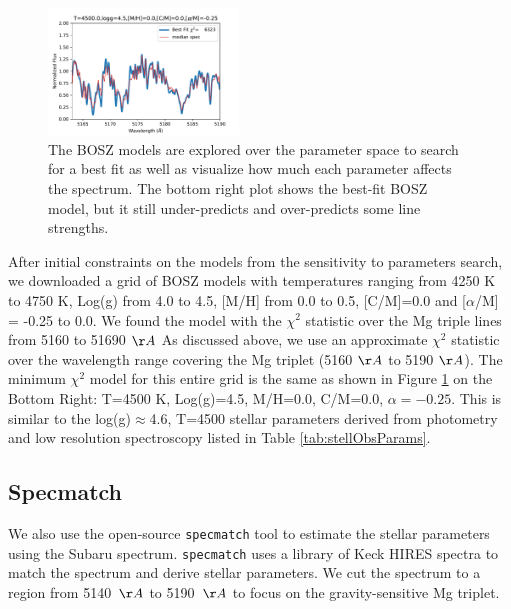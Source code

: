 \documentclass[preprint]{aastex61}
\begin{document}
\begin{figure}[!hbtp]
\begin{centering}
\includegraphics[width=0.45\textwidth]{images/bosz_model_exploration/FINAL_exploration.pdf}
\caption{The BOSZ models are explored over the parameter space to search for a best fit as well as visualize how much each parameter affects the spectrum.
The bottom right plot shows the best-fit BOSZ model, but it still under-predicts and over-predicts some line strengths.}\label{fig:boszModelParamsMedianSpec}
\end{centering}
\end{figure}

After initial constraints on the models from the sensitivity to parameters search, we downloaded a grid of BOSZ models with temperatures ranging from 4250 K to 4750 K, Log(g) from 4.0 to 4.5, [M/H] from 0.0 to 0.5, [C/M]=0.0 and [$\alpha$/M] = -0.25 to 0.0.
We found the model with the  $\chi^2$ statistic over the Mg triple lines from 5160 to 51690 $\AA$
As discussed above, we use an approximate $\chi^2$ statistic over the wavelength range covering the Mg triplet (5160 $\AA$ to 5190 $\AA$).
The minimum $\chi^2$ model for this entire grid is the same as shown in Figure \ref{fig:boszModelParamsMedianSpec} on the Bottom Right: T=4500 K, Log(g)=4.5, M/H=0.0, C/M=0.0, $\alpha=-0.25$.
This is similar to the log(g)$\approx$4.6, T=4500 stellar parameters derived from photometry and low resolution spectroscopy listed in Table \ref{tab:stellObsParams}.

\subsection{Specmatch}\label{sec:SpecMatch}

We also use the open-source \texttt{specmatch} tool \citep{yee2017specMatch} to estimate the stellar parameters using the Subaru spectrum.
\texttt{specmatch} uses a library of Keck HIRES spectra to match the spectrum and derive stellar parameters.
We cut the spectrum to a region from 5140~$\AA$ to 5190~$\AA$ to focus on the gravity-sensitive Mg triplet.
\end{document}
